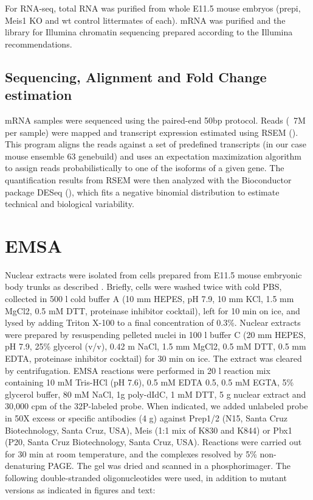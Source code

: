 For RNA-seq, total RNA was purified from whole E11.5 mouse embryos (\ac{prepi}, Meis1 \ac{KO} and wt control littermates of each). mRNA was purified and the library for Illumina chromatin sequencing prepared according to the Illumina recommendations.

\subsection{Sequencing, Alignment and Fold Change estimation}

mRNA samples were sequenced using the paired-end 50bp protocol. Reads (~7M per sample) were mapped and transcript expression estimated using RSEM (\cite{Li2011}). This program aligns the reads against a set of predefined transcripts (in our case mouse ensemble 63 genebuild) and uses an expectation maximization algorithm to assign reads probabilistically to one of the isoforms of a given gene. The quantification results from RSEM were then analyzed with the Bioconductor package DESeq (\cite{Anders2010}), which fits a negative binomial distribution to estimate technical and biological variability.


\section{EMSA}

Nuclear extracts were isolated from cells prepared from E11.5 mouse embryonic body trunks as described \parencite{Longobardi2003}. Briefly, cells were washed twice with cold PBS, collected in 500 \textmu l cold buffer A (10 mm HEPES, pH 7.9, 10 mm KCl, 1.5 mm MgCl2, 0.5 mM DTT, proteinase inhibitor cocktail), left for 10 min on ice, and lysed by adding Triton X-100 to a final concentration of 0.3\%. Nuclear extracts were prepared by resuspending pelleted nuclei in 100 \textmu l buffer C (20 mm HEPES, pH 7.9, 25\% glycerol (v/v), 0.42 m NaCl, 1.5 mm MgCl2, 0.5 mM DTT, 0.5 mm EDTA, proteinase inhibitor cocktail) for 30 min on ice. The extract was cleared by centrifugation.
EMSA reactions were performed in 20 \textmu l reaction mix containing 10 mM Tris-HCl (pH 7.6), 0.5 mM EDTA 0.5, 0.5 mM EGTA, 5\% glycerol buffer, 80 mM NaCl, 1\textmu g poly-dIdC, 1 mM DTT, 5 \textmu g nuclear extract and 30,000 cpm of the 32P-labeled probe. When indicated, we added unlabeled probe in 50X excess or specific antibodies (4 \textmu g) against Prep1/2 (N15, Santa Cruz Biotechnology, Santa Cruz, USA), Meis (1:1 mix of K830 and K844) or Pbx1 (P20, Santa Cruz Biotechnology, Santa Cruz, USA). Reactions were carried out for 30 min at room temperature, and the complexes resolved by 5\% non-denaturing PAGE. The gel was dried and scanned in a phosphorimager. 
The following double-stranded oligonucleotides were used, in addition to mutant versions as indicated in figures and text:

